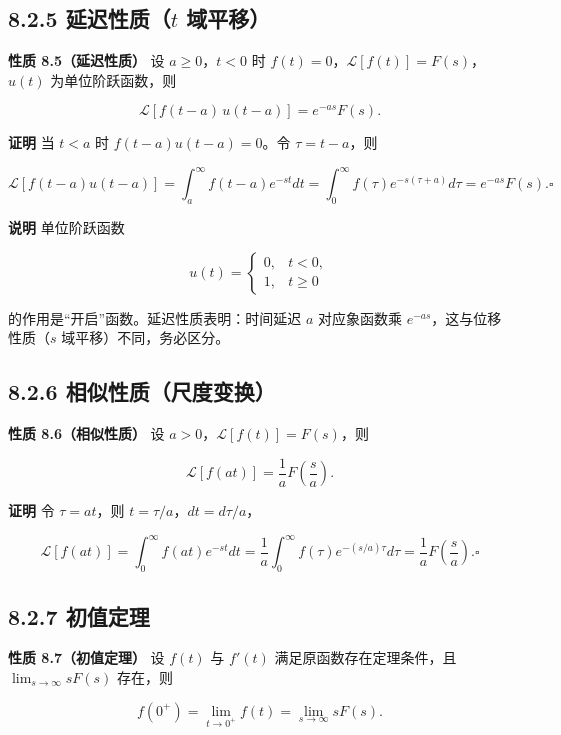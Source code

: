 \subsection{\texorpdfstring{8.2.5 延迟性质（\(t\)
域平移）}{8.2.5 延迟性质（t 域平移）}}\label{ux5ef6ux8fdfux6027ux8d28t-ux57dfux5e73ux79fb}

\textbf{性质 8.5（延迟性质）} 设 \(a\ge 0\)，\(t<0\) 时
\(f(t)=0\)，\(\mathcal{L}[f(t)]=F(s)\)，\(u(t)\) 为单位阶跃函数，则

\[
\mathcal{L}[f(t-a)\,u(t-a)] = e^{-as}F(s).
\]

\textbf{证明} 当 \(t<a\) 时 \(f(t-a)u(t-a)=0\)。令 \(\tau=t-a\)，则

\[
\mathcal{L}[f(t-a)u(t-a)]=\int_a^{\infty}f(t-a)e^{-st}dt
=\int_0^{\infty}f(\tau)e^{-s(\tau+a)}d\tau=e^{-as}F(s). \square
\]

\textbf{说明} 单位阶跃函数

\[
u(t)=\begin{cases}0,&t<0,\\1,&t\ge 0\end{cases}
\]

的作用是``开启''函数。延迟性质表明：时间延迟 \(a\) 对应象函数乘
\(e^{-as}\)，这与位移性质（\(s\) 域平移）不同，务必区分。

\subsection{8.2.6
相似性质（尺度变换）}\label{ux76f8ux4f3cux6027ux8d28ux5c3aux5ea6ux53d8ux6362-1}

\textbf{性质 8.6（相似性质）} 设 \(a>0\)，\(\mathcal{L}[f(t)]=F(s)\)，则

\[
\mathcal{L}[f(at)] = \frac{1}{a}F\left(\frac{s}{a}\right).
\]

\textbf{证明} 令 \(\tau=at\)，则 \(t=\tau/a\)，\(dt=d\tau/a\)，

\[
\mathcal{L}[f(at)]=\int_0^{\infty}f(at)e^{-st}dt
=\frac{1}{a}\int_0^{\infty}f(\tau)e^{-(s/a)\tau}d\tau
=\frac{1}{a}F\left(\frac{s}{a}\right). \square
\]

\subsection{8.2.7 初值定理}\label{ux521dux503cux5b9aux7406}

\textbf{性质 8.7（初值定理）} 设 \(f(t)\) 与 \(f'(t)\)
满足原函数存在定理条件，且 \(\lim_{s\to\infty}sF(s)\) 存在，则

\[
f(0^+)=\lim_{t\to 0^+}f(t)=\lim_{s\to\infty}sF(s).
\]

